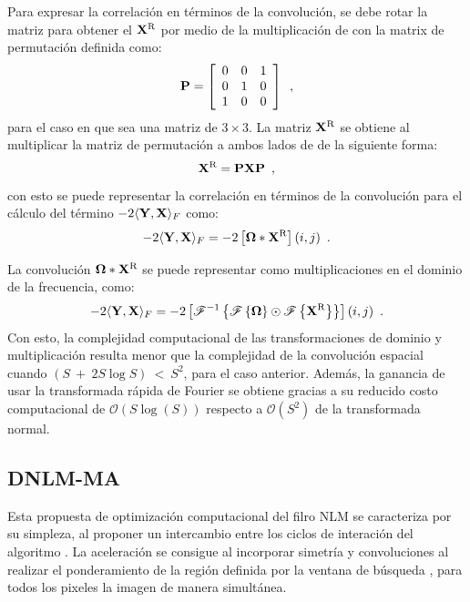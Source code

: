 Para expresar la correlación en términos de la convolución, se debe rotar la matriz  para obtener el $\mathbf{X}^\textrm{R}$ por medio de la multiplicaci\'on de  con la matrix de permutaci\'on definida como:
%
\begin{equation}
\mathbf{P} = \left[\begin{array}{ccc}
0 & 0 & 1\\
0 & 1 & 0\\
1 & 0 & 0
\end{array}\right] \enspace ,
\end{equation}
%
para el caso en que  sea una matriz de $3\times 3$. La matriz $\mathbf{X}^\textrm{R}$ se obtiene al multiplicar la matriz de permutaci\'on  a ambos lados de  de la siguiente forma:
%
\begin{equation}
\mathbf{X}^\text{R} = \mathbf{P}\mathbf{X}\mathbf{P} \enspace ,
\end{equation}
%
con esto se puede representar la correlaci\'on en t\'erminos de la convoluci\'on para el c\'alculo del t\'ermino $-2\langle\mathbf{Y},\mathbf{X}\rangle_{F}$ como:
%
\begin{equation}
-2\langle\mathbf{Y},\mathbf{X}\rangle_{F} = -2\left[\mathbf{\Omega} *\mathbf{X}^\text{R}\right](i,j) \enspace .
\end{equation}

La convoluci\'on $\mathbf{\Omega} *\mathbf{X}^\text{R}$ se puede representar como multiplicaciones en el dominio de la frecuencia, como:
%
\begin{equation}
-2\langle\mathbf{Y},\mathbf{X}\rangle_{F} = -2 \left[ \mathscr{F}^{-1}\left\{ \mathscr{F}\left\{\mathbf{\Omega}\right\} \odot \mathscr{F}\left\{\mathbf{X}^\text{R}\right\}\right\} \right](i,j) \enspace .
\end{equation}
%
Con esto, la complejidad computacional de las transformaciones de dominio y multiplicaci\'on resulta menor que la complejidad de la convoluci\'on espacial cuando $(S~+~2S\log{S})~<~S^2$, para el caso anterior. Adem\'as, la ganancia de usar la transformada r\'apida de Fourier se obtiene gracias a su reducido costo computacional de $\mathcal{O}(S\log(S))$ respecto a $\mathcal{O}(S^2)$ de la transformada normal.




\subsection{DNLM-MA}
\label{ch:marco_condat}

Esta propuesta de optimización computacional del filro NLM se caracteriza por su simpleza, al proponer un intercambio entre los ciclos de interación del algoritmo \cite{Condat2010}. La aceleración se consigue al incorporar simetría y convoluciones al realizar el ponderamiento de la región definida por la ventana de búsqueda \mat{\Omega}, para todos los pixeles la imagen de manera simultánea.

